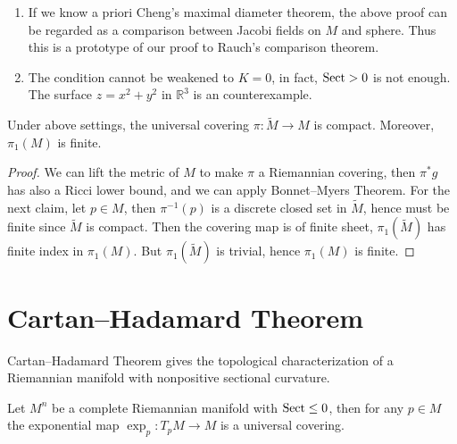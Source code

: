 \begin{rem}
    \begin{enumerate}[(1)]
        \item If we know a priori Cheng's maximal diameter theorem, the above proof can be regarded as a comparison between Jacobi fields on $M$ and sphere.
        Thus this is a prototype of our proof to Rauch's comparison theorem.
        \item The condition cannot be weakened to $K=0$, in fact, $\operatorname{Sect}>0$ is not enough.
        The surface $z=x^2+y^2$ in $\mathbb{R}^3$ is an counterexample.
    \end{enumerate}
\end{rem}

\begin{cor}
    Under above settings, the universal covering $\pi:\tilde{M}\to M$ is compact.
    Moreover, $\pi_1(M)$ is finite.
\end{cor}
\begin{proof}
    We can lift the metric of $M$ to make $\pi$ a Riemannian covering, then $\pi^*g$ has also a Ricci lower bound, and we can apply Bonnet--Myers Theorem.
    For the next claim, let $p\in M$, then $\pi^{-1}(p)$ is a discrete closed set in $\tilde{M}$, hence must be finite since $\tilde{M}$ is compact.
    Then the covering map is of finite sheet, $\pi_1(\tilde{M})$ has finite index in $\pi_1(M)$.
    But $\pi_1(\tilde{M})$ is trivial, hence $\pi_1(M)$ is finite.
\end{proof}

\section{Cartan--Hadamard Theorem}

Cartan--Hadamard Theorem gives the topological characterization of a Riemannian manifold with nonpositive sectional curvature.

\begin{thm}
    Let $M^n$ be a complete Riemannian manifold with $\operatorname{Sect}\leq 0$, then for any $p\in M$ the exponential map $\exp_p:T_pM\to M$ is a universal covering.
\end{thm}
